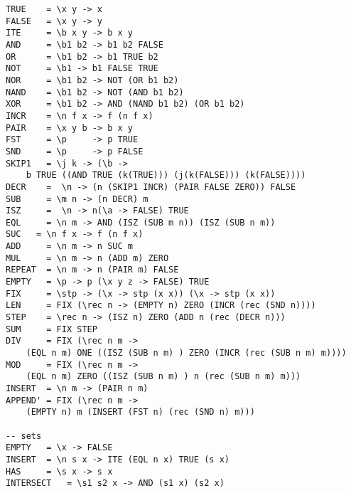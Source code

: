 \documentclass[landscape,8pt]{extarticle}
\begin{document}
\begin{multicols}{3}
\begin{itemize}
\begin{lstlisting}
TRUE    = \x y -> x
FALSE   = \x y -> y
ITE     = \b x y -> b x y
AND     = \b1 b2 -> b1 b2 FALSE
OR      = \b1 b2 -> b1 TRUE b2
NOT     = \b1 -> b1 FALSE TRUE
NOR     = \b1 b2 -> NOT (OR b1 b2)
NAND    = \b1 b2 -> NOT (AND b1 b2)
XOR     = \b1 b2 -> AND (NAND b1 b2) (OR b1 b2)
INCR    = \n f x -> f (n f x)
PAIR    = \x y b -> b x y
FST     = \p     -> p TRUE
SND     = \p     -> p FALSE
SKIP1   = \j k -> (\b ->
    b TRUE ((AND TRUE (k(TRUE))) (j(k(FALSE))) (k(FALSE))))
DECR    =  \n -> (n (SKIP1 INCR) (PAIR FALSE ZERO)) FALSE
SUB     = \m n -> (n DECR) m
ISZ     =  \n -> n(\a -> FALSE) TRUE
EQL     = \n m -> AND (ISZ (SUB m n)) (ISZ (SUB n m))
SUC   = \n f x -> f (n f x)
ADD     = \n m -> n SUC m
MUL     = \n m -> n (ADD m) ZERO
REPEAT  = \n m -> n (PAIR m) FALSE
EMPTY   = \p -> p (\x y z -> FALSE) TRUE
FIX     = \stp -> (\x -> stp (x x)) (\x -> stp (x x))
LEN     = FIX (\rec n -> (EMPTY n) ZERO (INCR (rec (SND n))))
STEP    = \rec n -> (ISZ n) ZERO (ADD n (rec (DECR n)))
SUM     = FIX STEP
DIV     = FIX (\rec n m ->
    (EQL n m) ONE ((ISZ (SUB n m) ) ZERO (INCR (rec (SUB n m) m))))
MOD     = FIX (\rec n m ->
    (EQL n m) ZERO ((ISZ (SUB n m) ) n (rec (SUB n m) m)))
INSERT  = \n m -> (PAIR n m)
APPEND' = FIX (\rec n m ->
    (EMPTY n) m (INSERT (FST n) (rec (SND n) m)))

-- sets
EMPTY   = \x -> FALSE
INSERT  = \n s x -> ITE (EQL n x) TRUE (s x)
HAS     = \s x -> s x
INTERSECT   = \s1 s2 x -> AND (s1 x) (s2 x)
            \end{lstlisting}

    \end{itemize}
\end{multicols}
\end{document}
